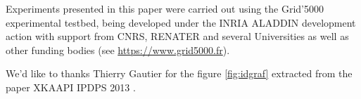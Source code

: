 \documentclass[10pt, conference, compsocconf,pdftex,dvipsnames]{IEEEtran}
\begin{document}
Experiments presented in this paper were carried out using the Grid'5000
experimental testbed, being developed under the INRIA ALADDIN development 
action with support from CNRS, RENATER and several Universities as well as
other funding bodies (see \url{https://www.grid5000.fr}).


We'd like to thanks Thierry Gautier for the figure \ref{fig:idgraf} extracted
from the paper XKAAPI IPDPS 2013 \cite{gautierxkaapi}.






\listoftodos



\end{document}
